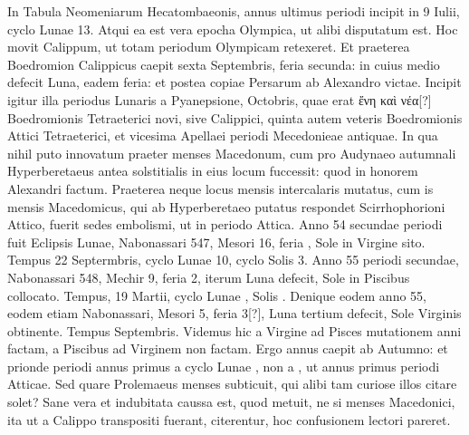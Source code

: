 In Tabula Neomeniarum Hecatombaeonis,
annus ultimus periodi incipit in 9 Iulii, cyclo Lunae 13.
Atqui ea est vera epocha Olympica, ut alibi disputatum est.
Hoc
movit Calippum, ut totam periodum Olympicam retexeret.
Et
praeterea Boedromion Calippicus caepit sexta Septembris, feria secunda:
in cuius medio defecit Luna, eadem feria: et postea copiae
Persarum ab Alexandro victae.
Incipit igitur illa periodus Lunaris
a Pyanepsione,  Octobris, quae erat
 \textgreek{ἔνη καὶ νέα[?]} Boedromionis Tetraeterici
novi, sive Calippici, quinta autem veteris Boedromionis
Attici Tetraeterici, et vicesima Apellaei periodi Mecedonieae antiquae.
In qua nihil puto innovatum praeter menses Macedonum, cum
pro Audynaeo autumnali Hyperberetaeus antea solstitialis in eius
locum fuccessit: quod in honorem Alexandri factum.
Praeterea neque
locus mensis intercalaris mutatus, cum is mensis Macedomicus,
qui ab Hyperberetaeo putatus respondet Scirrhophorioni Attico,
fuerit sedes embolismi, ut in periodo Attica.
Anno 54 secundae periodi
fuit Eclipsis Lunae, Nabonassari 547, Mesori 16, feria , Sole
in Virgine sito.
Tempus 22 Septermbris, cyclo Lunae 10, cyclo
Solis 3.
Anno 55 periodi secundae, Nabonassari 548, Mechir 9,
feria 2, iterum Luna defecit, Sole in Piscibus collocato.
Tempus, 19
Martii, cyclo Lunae , Solis .
Denique eodem anno 55, eodem
etiam Nabonassari, Mesori 5, feria
3[?], Luna tertium defecit, Sole 
Virginis obtinente.
Tempus 
Septembris.
Videmus hic a Virgine
ad Pisces mutationem anni factam,
a Piscibus ad Virginem non
factam.
Ergo annus caepit ab Autumno:
et prionde periodi annus
primus a cyclo Lunae , non a
, ut annus primus periodi Atticae.
Sed quare Prolemaeus menses
subticuit, qui alibi tam curiose illos citare solet?
Sane vera et indubitata
caussa est, quod metuit, ne si menses Macedonici, ita ut a Calippo
transpositi fuerant, citerentur, hoc confusionem lectori pareret.

